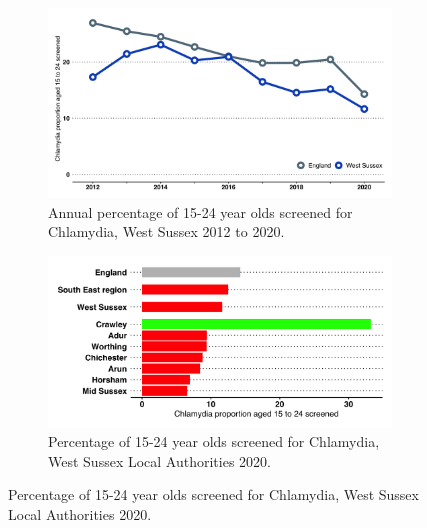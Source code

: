 \begin{figure}[H]
    \caption{Percentage chlamydia screening over time and in West Sussex Local Authorities.}
    \label{figure:unpaidcarers:dabs}
    \centering
    \begin{subfigure}[b]{0.99\linewidth}
        \centering
        \caption{Annual percentage of 15-24 year olds screened  for Chlamydia, West Sussex 2012 to 2020.}\label{fig:chlamydia:p_u25_time}
        \includegraphics[width=\linewidth]{images/ct_screened_line.png}
    \end{subfigure}
    \begin{subfigure}[b]{0.99\linewidth}
        \centering
        \caption{Percentage of 15-24 year olds screened for Chlamydia, West Sussex Local Authorities 2020.}\label{fig:chlamydia:p_u25_dabs}        
        \includegraphics[width=\linewidth]{images/chlamydia_screen_yp_rag_bar.png}
    \end{subfigure}
    \vspace*{3mm}
\end{figure}




